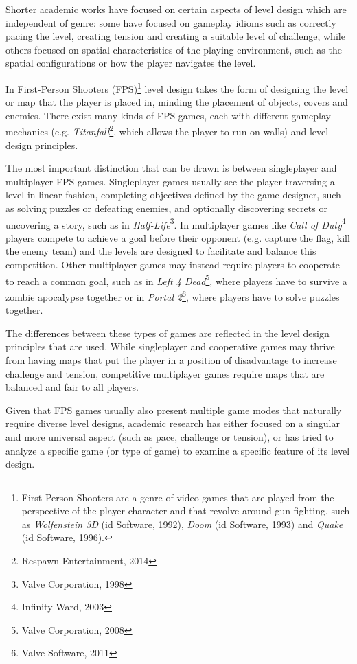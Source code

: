 Shorter academic works have focused on certain aspects of level design which are independent of genre: some have focused on gameplay idioms such as correctly pacing the level, creating tension and creating a suitable level of challenge, while others focused on spatial characteristics of the playing environment, such as the spatial configurations or how the player navigates the level. \cite{hullett_design_2010}

In First-Person Shooters (FPS)\footnote{First-Person Shooters are a genre of video games that are played from the perspective of the player character and that revolve around gun-fighting, such as \textit{Wolfenstein 3D} (id Software, 1992), \textit{Doom} (id Software, 1993) and \textit{Quake} (id Software, 1996).} level design takes the form of designing the level or map that the player is placed in, minding the placement of objects, covers and enemies. There exist many kinds of FPS games, each with different gameplay mechanics (e.g. \textit{Titanfall}\footnote{Respawn Entertainment, 2014}, which allows the player to run on walls) and level design principles. 

The most important distinction that can be drawn is between singleplayer and multiplayer FPS games. Singleplayer games usually see the player traversing a level in linear fashion, completing objectives defined by the game designer, such as solving puzzles or defeating enemies, and optionally discovering secrets or uncovering a story, such as in \textit{Half-Life}\footnote{Valve Corporation, 1998}. In multiplayer games like \textit{Call of Duty}\footnote{Infinity Ward, 2003} players compete to achieve a goal before their opponent (e.g. capture the flag, kill the enemy team) and the levels are designed to facilitate and balance this competition. Other multiplayer games may instead require players to cooperate to reach a common goal, such as in \textit{Left 4 Dead}\footnote{Valve Corporation, 2008}, where players have to survive a zombie apocalypse together or in \textit{Portal 2}\footnote{Valve Software, 2011}, where players have to solve puzzles together.

The differences between these types of games are reflected in the level design principles that are used. While singleplayer and cooperative games may thrive from having maps that put the player in a position of disadvantage to increase challenge and tension, competitive multiplayer games require maps that are balanced and fair to all players. 

Given that FPS games usually also present multiple game modes that naturally require diverse level designs, academic research has either focused on a singular and more universal aspect (such as pace, challenge or tension), or has tried to analyze a specific game (or type of game) to examine a specific feature of its level design.


